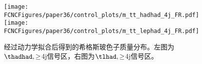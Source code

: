 
\begin{figure}[htb]
\centering
\texttt{[image: \\FCNCFigures/paper36/control\_plots/m\_tt\_hadhad\_4j\_FR.pdf]}
\texttt{[image: \\FCNCFigures/paper36/control\_plots/m\_tt\_lephad\_4j\_FR.pdf]}
\caption{经过动力学拟合后得到的希格斯玻色子质量分布。左图为$\thadhad,\ge$4j信号区，右图为$\tlhad,\ge$4j信号区。}
\label{fig:higgsmass36}
\end{figure}